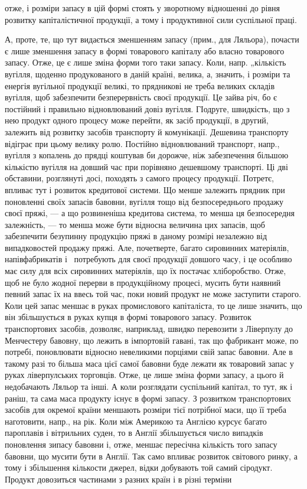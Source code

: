 \parcont{}  %
отже, і розміри запасу в цій формі стоять у зворотному відношенні до
рівня розвитку капіталістичної продукції, а тому і продуктивної сили
суспільної праці.

А, проте, те, що тут видається зменшенням запасу (прим., для Ляльора),
почасти є лише зменшення запасу в формі товарового капіталу або
власно товарового запасу. Отже, це є лише зміна форми того таки запасу.
Коли, напр. „кількість вугілля, щоденно продукованого в даній країні,
велика, а, значить, і розміри та енергія вугільної продукції великі, то
прядникові не треба великих складів вугілля, щоб забезпечити безперервність
своєї продукції. Це зайва річ, бо є постійний і правильно
відновлюваний довіз вугілля. ГІодруге, швидкість, що з нею продукт
одного процесу може перейти, як засіб продукції, в другий, залежить
від розвитку засобів транспорту й комунікації. Дешевина транспорту
відіграє при цьому велику ролю. Постійно відновлюваний транспорт,
напр., вугілля з копалень до прядці коштував би дорожче, ніж забезпечення
більшою кількістю вугілля на довший час при порівняно дешевшому
транспорті. Ці дві обставини, розглянуті досі, походять з самого процесу
продукції. Потретє, впливає тут і розвиток кредитової системи. Що менше
залежить прядник при поновленні своїх запасів бавовни, вугілля тощо від
безпосереднього продажу своєї пряжі, — а що розвиненіша кредитова система,
то менша ця безпосередня залежність, — то менша може бути відносна
величина цих запасів, щоб забезпечити безупинну продукцію пряжі
в даному розмірі незалежно від випадковостей продажу пряжі. Але,
почетверте, багато сировинних матеріялів, напівфабрикатів і~ потребують
для своєї продукції довшого часу, і це особливо має силу для
всіх сировинних матеріялів, що їх постачає хліборобство. Отже, щоб не
було жодної перерви в продукційному процесі, мусить бути наявний
певний запас їх на ввесь той час, поки новий продукт не може заступити
старого. Коли цей запас меншає в руках промислового капіталіста,
то це лише значить, що він збільшується в руках купця в
формі товарового запасу. Розвиток транспортових засобів, дозволяє, наприклад,
швидко перевозити з Ліверпулу до Менчестеру бавовну, що
лежить в імпортовій гавані, так що фабрикант може, по потребі, поновлювати
відносно невеликими порціями свій запас бавовни. Але в такому
разі то більша маса цієї самої бавовни буде лежати як товаровий
запас у руках ліверпулських торговців. Отже, це лише зміна форми запасу,
а цього й недобачають Ляльор та інші. А коли розглядати суспільний
капітал, то тут, як і раніш, та сама маса продукту існує в формі
запасу. З розвитком транспортових засобів для окремої країни меншають
розміри тієї потрібної маси, що її треба наготовити, напр., на рік.
Коли між Америкою та Англією курсує багато пароплавів і вітрильних
суден, то в Англії збільшується число випадків поновлення зипасу бавовни
і, отже, меншає пересічна кількість того запасу бавовни, що мусити
бути в Англії. Так само впливає розвиток світового ринку, а
тому і збільшення кількости джерел, відки добувають той самий
сіродукт. Продукт довозиться частинами з разних країн і в різні терміни
\parbreak{}  %
